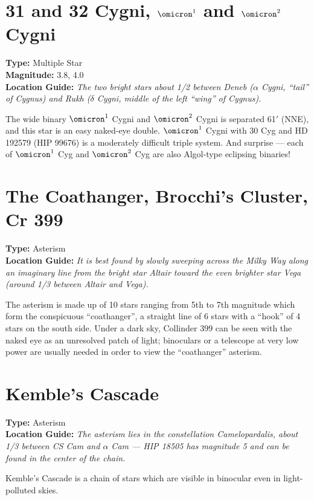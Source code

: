 \section{31 and 32 Cygni, \texorpdfstring{$\omicron^1$ and $\omicron^2$}{omicron1 and omicron2} Cygni}
\textbf{Type:} Multiple Star \\
\textbf{Magnitude:} 3.8, 4.0 \\
\textbf{Location Guide:} \textit{The two bright stars about 1/2
  between Deneb ($\alpha$ Cygni, ``tail'' of Cygnus) and Rukh
  ($\delta$ Cygni, middle of the left ``wing'' of Cygnus).}

The wide binary $\omicron^1$ Cygni and $\omicron^2$ Cygni is separated
61$'$ (NNE), and this star is an easy naked-eye double. $\omicron^1$
Cygni with 30 Cyg and HD 192579 (HIP 99676) is a moderately difficult
triple system. And surprise --- each of $\omicron^1$ Cyg and
$\omicron^2$ Cyg are also Algol-type eclipsing binaries!

\section{The Coathanger, Brocchi's Cluster, Cr 399}
\textbf{Type:} Asterism \\
\textbf{Location Guide:} \textit{It is best found by slowly sweeping
  across the Milky Way along an imaginary line from the bright star
  Altair toward the even brighter star Vega (around 1/3 between Altair
  and Vega).}

The asterism is made up of 10 stars ranging from 5th to 7th magnitude
which form the conspicuous ``coathanger'', a straight line of 6 stars
with a ``hook'' of 4 stars on the south side. Under a dark sky,
Collinder 399 can be seen with the naked eye as an unresolved patch of
light; binoculars or a telescope at very low power are usually needed
in order to view the ``coathanger'' asterism.

\section{Kemble's Cascade}
\textbf{Type:} Asterism \\
\textbf{Location Guide:} \textit{The asterism lies in the
  constellation Camelopardalis, about 1/3 between CS Cam and $\alpha$
  Cam --- HIP 18505 has magnitude 5 and can be found in the center of the
  chain.}

Kemble's Cascade is a chain of stars which are visible in binocular even
in light-polluted skies.

